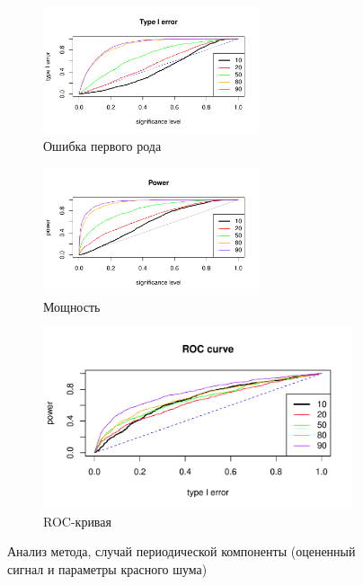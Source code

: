 \documentclass[specialist,
substylefile = spbu_report.rtx,
subf,href,colorlinks=true, 12pt]{disser}
\theoremstyle{definition}
\begin{document}
\begin{figure}[h]
	\captionsetup[subfigure]{justification=Centering}
	\begin{subfigure}[t]{\textwidth}
		\centering
		\includegraphics[width=0.7\textwidth]{img/type1error_sin_est_noise_signal.pdf}
		\caption{Ошибка первого рода}
		\label{fig:sin_est_noise_signal_type1error}
	\end{subfigure}
	\begin{subfigure}[t]{\textwidth}
		\centering
		\includegraphics[width=0.7\textwidth]{img/power_sin_est_noise_signal.pdf}
		\caption{Мощность}
		\label{fig:sin_est_noise_signal_power}
	\end{subfigure}
	\begin{subfigure}[t]{\textwidth}
		\centering
		\includegraphics[width=0.7\linewidth]{img/roc_sin_est_noise_signal.pdf}
		\caption{ROC-кривая}
		\label{fig:sin_est_noise_signal_roc}
	\end{subfigure}
	\caption{Анализ метода, случай периодической компоненты (оцененный сигнал и параметры красного шума)}
	\label{fig:sin_est_noise_signal}
\end{figure}
\end{document}
